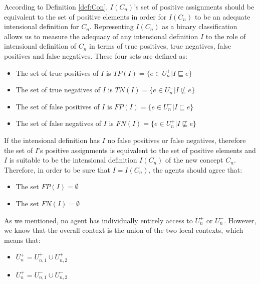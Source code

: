 According to Definition \ref{def:Con}, $I(C_{n})$'s set of positive assignments should be equivalent to the set of positive elements in order for $I(C_{n})$ to be an adequate intensional definition for $C_{n}$. Representing $I(C_{n})$ as a binary classification allows us to measure the adequacy of any intensional definition $I$ to the role of intensional definition of $C_{n}$ in terms of true positives, true negatives, false positives and false negatives. These four sets are defined as:

\begin{itemize}
    \item The set of true positives of $I$ is $TP(I) = \{ e \in U^{+}_{n} | I \sqsubseteq e \}$
    \item The set of true negatives of $I$ is $TN(I) = \{ e \in U^{-}_{n} | I \not \sqsubseteq e \}$
    \item The set of false positives of $I$ is $FP(I) = \{ e \in U^{-}_{n} | I \sqsubseteq e \}$
    \item The set of false negatives of $I$ is $FN(I) = \{ e \in U^{+}_{n} | I \not \sqsubseteq e \}$
\end{itemize}

If the intensional definition has $I$ no false positives or false negatives, therefore the set of $I$'s positive assignments is equivalent to the set of positive elements and $I$ is suitable to be the intensional definition $I(C_{n})$ of the new concept $C_{n}$. Therefore, in order to be sure that $I = I(C_{n})$, the agents should agree that:

\begin{itemize}
    \item The set $FP(I) = \emptyset$
    \item The set $FN(I) = \emptyset$
\end{itemize}

As we mentioned, no agent has individually entirely access to $U^{+}_{n}$ or $U^{-}_{n}$. However, we know that the overall context is the union of the two local contexts, which means that:

\begin{itemize}
    \item $U^{+}_{n} = U^{+}_{n,1} \cup U^{+}_{n,2}$
    \item $U^{+}_{n} = U^{-}_{n,1} \cup U^{-}_{n,2}$
\end{itemize}


